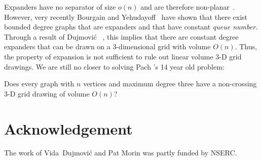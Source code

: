 \documentclass{patmorin}
\begin{document}
Expanders have no separator of size $o(n)$ and are therefore
non-planar~\cite{lipton.tarjan:separator}.  However, very recently
Bourgain and Yehudayoff~\cite{bourgain.yehudayoff:monotone} have
shown that there exist bounded degree graphs that are expanders and
that have constant \emph{queue number}. Through a result of Dujmovi\'c
\etal~\cite[Theorem~8]{dujmovic.por.ea:track}, this implies that there
are constant degree expanders that can be drawn on a 3-dimensional grid
with volume $O(n)$. Thus, the property of expansion is not sufficient
to rule out linear volume 3-D grid drawings.  We are still no closer
to solving Pach \etal's 14 year old problem:

\begin{op}
  Does every graph with $n$ vertices and maximum degree three have a
  non-crossing 3-D grid drawing of volume $O(n)$?
\end{op}


\section*{Acknowledgement}

The work of Vida~Dujmovi\'c and Pat Morin was partly funded by NSERC.



\end{document}
